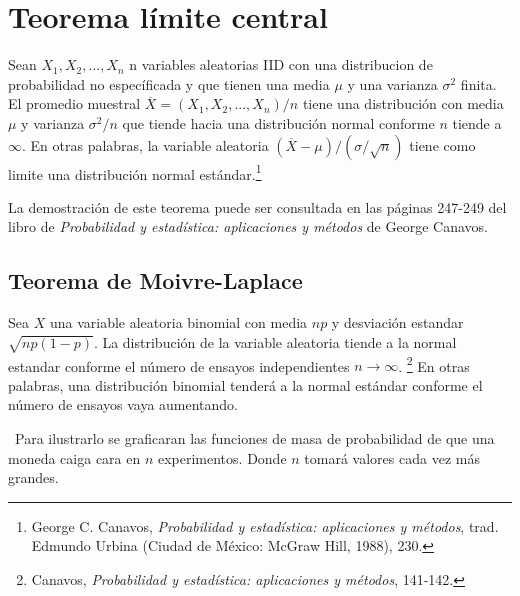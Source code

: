 \documentclass[8pt]{article}
\begin{document}

\section{Teorema límite central}

Sean $X_1, X_2, ..., X_n$ n variables aleatorias IID con una distribucion de probabilidad no específicada y que tienen una media $\mu$ y una varianza $\sigma^2$ finita. El promedio muestral $\overline{X} = (X_1, X_2, ..., X_n)/n$ tiene una distribución con media $\mu$ y varianza $\sigma^2/n$ que tiende hacia una distribución normal conforme $n$ tiende a $\infty$. En otras palabras, la variable aleatoria $(\overline{X}-\mu)/(\sigma/\sqrt{n})$ tiene como limite una distribución normal estándar.\footnote{George C. Canavos, \textit{Probabilidad y estadística: aplicaciones y métodos}, trad. Edmundo Urbina (Ciudad de México: McGraw Hill, 1988), 230.} 

La demostración de este teorema puede ser consultada en las páginas 247-249 del libro de \textit{Probabilidad y estadística: aplicaciones y métodos} de George Canavos.

\subsection{Teorema de Moivre-Laplace}

Sea $X$ una variable aleatoria binomial con media $np$ y desviación estandar $\sqrt{np(1-p)}$. La distribución de la variable aleatoria tiende a la normal estandar conforme el número de ensayos independientes $n \rightarrow \infty$. \footnote{Canavos, \textit{Probabilidad y estadística: aplicaciones y métodos}, 141-142.} En otras palabras, una distribución binomial tenderá a la normal estándar conforme el número de ensayos vaya aumentando.

\
Para ilustrarlo se graficaran las funciones de masa de probabilidad de que una moneda caiga cara en $n$ experimentos. Donde $n$ tomará valores cada vez más grandes.\
\end{document}
